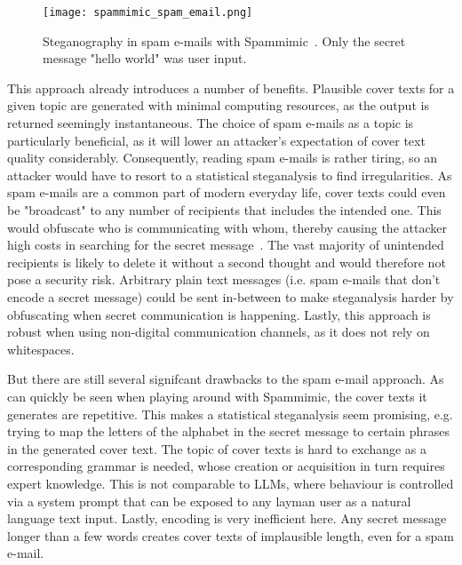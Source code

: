 \begin{figure}
    \begin{wide}
        \centering
        \captionsetup{width=\linewidth}
        \texttt{[image: spammimic\_spam\_email.png]}
        \caption[Spammimic]{Steganography in spam e-mails with Spammimic~\cite{spammimicSpammimic2000}. Only the secret message "hello world" was user input.}
        \label{fig:spammimicSpamEmail}
    \end{wide}
\end{figure}

This approach already introduces a number of benefits. Plausible cover texts for a given topic are generated with minimal computing resources, as the output is returned seemingly instantaneous. The choice of spam e-mails as a topic is particularly beneficial, as it will lower an attacker's expectation of cover text quality considerably. Consequently, reading spam e-mails is rather tiring, so an attacker would have to resort to a statistical steganalysis to find irregularities. As spam e-mails are a common part of modern everyday life, cover texts could even be "broadcast" to any number of recipients that includes the intended one. This would obfuscate who is communicating with whom, thereby causing the attacker high costs in searching for the secret message~\cite{bennettLinguisticSteganographySurvey2004,petitcolasInformationHidingSurvey1999}. The vast majority of unintended recipients is likely to delete it without a second thought and would therefore not pose a security risk. Arbitrary plain text messages (i.e. spam e-mails that don't encode a secret message) could be sent in-between to make steganalysis harder by obfuscating when secret communication is happening. Lastly, this approach is robust when using non-digital communication channels, as it does not rely on whitespaces.

But there are still several signifcant drawbacks to the spam e-mail approach. As can quickly be seen when playing around with Spammimic, the cover texts it generates are repetitive. This makes a statistical steganalysis seem promising, e.g. trying to map the letters of the alphabet in the secret message to certain phrases in the generated cover text. The topic of cover texts is hard to exchange as a corresponding grammar is needed, whose creation or acquisition in turn requires expert knowledge. This is not comparable to \glspl{LLM}, where behaviour is controlled via a system prompt that can be exposed to any layman user as a natural language text input. Lastly, encoding is very inefficient here. Any secret message longer than a few words creates cover texts of implausible length, even for a spam e-mail.

